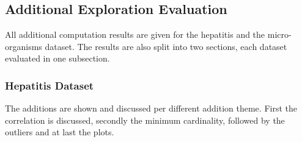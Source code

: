 \documentclass[10pt,a4paper]{article}
\begin{document}
	\subsection{Additional Exploration Evaluation}
	\label{subsec:ResultsAdditionalEvaluation}
	
	All additional computation results are given for the hepatitis and the micro-organisms dataset. The results are also split into two sections, each dataset evaluated in one subsection.
	
	\subsubsection{Hepatitis Dataset}
	\label{subsec:AdditionalResultHepatitis}
	
	The additions are shown and discussed per different addition theme. First the correlation is discussed, secondly the minimum cardinality, followed by the outliers and at last the plots.
	
\end{document}
